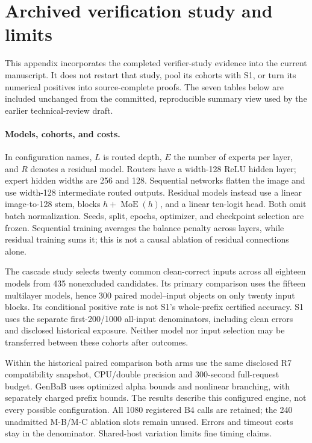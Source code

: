 \section{Archived verification study and limits}
\label{app:empirical}
This appendix incorporates the completed verifier-study evidence into the
current manuscript. It does not restart that study, pool its cohorts with S1,
or turn its numerical positives into source-complete proofs. The seven tables
below are included unchanged from the committed, reproducible summary view
used by the earlier technical-review draft.

\paragraph{Models, cohorts, and costs.}
In configuration names, $L$ is routed depth, $E$ the number of experts per
layer, and $R$ denotes a residual model. Routers have a width-128 ReLU hidden
layer; expert hidden widths are 256 and 128. Sequential networks flatten the
image and use width-128 intermediate routed outputs. Residual models instead
use a linear image-to-128 stem, blocks $h+\operatorname{MoE}(h)$, and a linear
ten-logit head. Both omit batch normalization. Seeds, split, epochs, optimizer,
and checkpoint selection are frozen. Sequential training averages the balance
penalty across layers, while residual training sums it; this is not a causal
ablation of residual connections alone.

The cascade study selects twenty common clean-correct inputs across all
eighteen models from 435 nonexcluded candidates. Its primary comparison uses
the fifteen multilayer models, hence 300 paired model--input objects on only
twenty input blocks. Its conditional positive rate is not S1's whole-prefix
certified accuracy. S1 uses the separate first-200/1000 all-input denominators,
including clean errors and disclosed historical exposure. Neither model nor
input selection may be transferred between these cohorts after outcomes.

Within the historical paired comparison both arms use the same disclosed R7
compatibility snapshot, CPU/double precision and 300-second full-request budget. GenBaB uses optimized
alpha bounds and nonlinear branching, with separately charged prefix bounds.
The results describe this configured engine, not every possible configuration.
All 1080 registered B4 calls are retained;
the 240 unadmitted M-B/M-C ablation slots remain unused. Errors and timeout
costs stay in the denominator. Shared-host variation limits fine timing claims.


